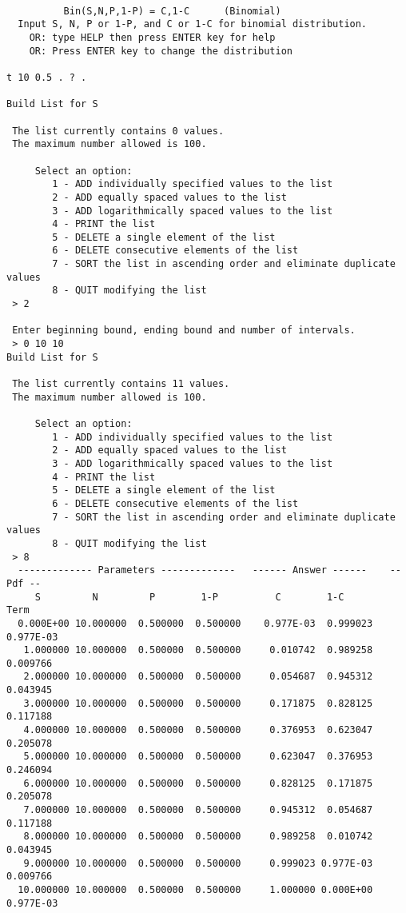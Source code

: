 \documentclass[12pt,dvips]{article}
\begin{document}
\begin{verbatim}

          Bin(S,N,P,1-P) = C,1-C      (Binomial)
  Input S, N, P or 1-P, and C or 1-C for binomial distribution.
    OR: type HELP then press ENTER key for help
    OR: Press ENTER key to change the distribution

t 10 0.5 . ? .

Build List for S

 The list currently contains 0 values.
 The maximum number allowed is 100.

     Select an option:
        1 - ADD individually specified values to the list
        2 - ADD equally spaced values to the list
        3 - ADD logarithmically spaced values to the list
        4 - PRINT the list
        5 - DELETE a single element of the list
        6 - DELETE consecutive elements of the list
        7 - SORT the list in ascending order and eliminate duplicate values
        8 - QUIT modifying the list
 > 2

 Enter beginning bound, ending bound and number of intervals.
 > 0 10 10
Build List for S

 The list currently contains 11 values.
 The maximum number allowed is 100.

     Select an option:
        1 - ADD individually specified values to the list
        2 - ADD equally spaced values to the list
        3 - ADD logarithmically spaced values to the list
        4 - PRINT the list
        5 - DELETE a single element of the list
        6 - DELETE consecutive elements of the list
        7 - SORT the list in ascending order and eliminate duplicate values
        8 - QUIT modifying the list
 > 8
  ------------- Parameters -------------   ------ Answer ------    -- Pdf --
     S         N         P        1-P          C        1-C          Term
  0.000E+00 10.000000  0.500000  0.500000    0.977E-03  0.999023    0.977E-03
   1.000000 10.000000  0.500000  0.500000     0.010742  0.989258     0.009766
   2.000000 10.000000  0.500000  0.500000     0.054687  0.945312     0.043945
   3.000000 10.000000  0.500000  0.500000     0.171875  0.828125     0.117188
   4.000000 10.000000  0.500000  0.500000     0.376953  0.623047     0.205078
   5.000000 10.000000  0.500000  0.500000     0.623047  0.376953     0.246094
   6.000000 10.000000  0.500000  0.500000     0.828125  0.171875     0.205078
   7.000000 10.000000  0.500000  0.500000     0.945312  0.054687     0.117188
   8.000000 10.000000  0.500000  0.500000     0.989258  0.010742     0.043945
   9.000000 10.000000  0.500000  0.500000     0.999023 0.977E-03     0.009766
  10.000000 10.000000  0.500000  0.500000     1.000000 0.000E+00    0.977E-03

\end{verbatim}
\end{document}
